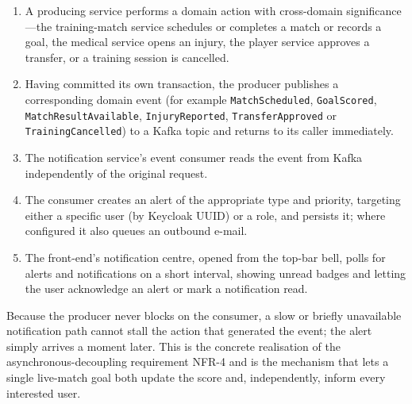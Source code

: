 \begin{enumerate}
  \item A producing service performs a domain action with cross-domain significance---the
  training-match service schedules or completes a match or records a goal, the medical service
  opens an injury, the player service approves a transfer, or a training session is cancelled.
  \item Having committed its own transaction, the producer publishes a corresponding domain
  event (for example \texttt{MatchScheduled}, \texttt{GoalScored},
  \texttt{MatchResultAvailable}, \texttt{InjuryReported}, \texttt{TransferApproved} or
  \texttt{TrainingCancelled}) to a Kafka topic and returns to its caller immediately.
  \item The notification service's event consumer reads the event from Kafka independently of
  the original request.
  \item The consumer creates an alert of the appropriate type and priority, targeting either a
  specific user (by Keycloak UUID) or a role, and persists it; where configured it also queues
  an outbound e-mail.
  \item The front-end's notification centre, opened from the top-bar bell, polls for alerts and
  notifications on a short interval, showing unread badges and letting the user acknowledge an
  alert or mark a notification read.
\end{enumerate}

Because the producer never blocks on the consumer, a slow or briefly unavailable notification
path cannot stall the action that generated the event; the alert simply arrives a moment
later. This is the concrete realisation of the asynchronous-decoupling requirement NFR-4 and is
the mechanism that lets a single live-match goal both update the score and, independently,
inform every interested user.
